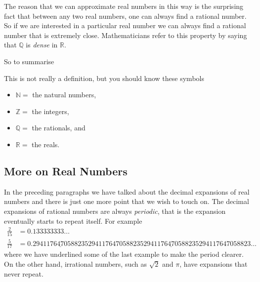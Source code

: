 \begin{itemize}
The reason that we can approximate real numbers in this way is the
surprising fact that between any two real numbers, one can always find a
rational number. So if we are interested in a particular real number we can
always find a rational number that is extremely close. Mathematicians refer
to this property by saying that $\mathbb{Q}$ is \emph{dense} in $\mathbb{R}$.
\end{itemize}
So to summarise
\begin{defn}\label{def_0_1_1}
  This is not really a definition, but you should know these symbols
 \begin{itemize}
  \item $\mathbb{N} = $ the natural numbers,
  \item $\mathbb{Z} = $ the integers,
  \item $\mathbb{Q} = $ the rationals, and
  \item $\mathbb{R} = $ the reals.
 \end{itemize}

\end{defn}



\subsection*{More on Real Numbers}
In the preceding paragraphs we have talked about the decimal expansions of real
numbers and there is just one more point that we wish to touch on. The decimal
expansions of rational numbers are always \emph{periodic}, that is the expansion
eventually starts to repeat itself. For example
\begin{align*}
  \frac{2}{15} &= 0.133333333\dots \\
  \frac{5}{17} &=
0.\underline{
2941176470588235}2941176470588235\underline{2941176470588235}
294117647058823\dots
\end{align*}
where we have underlined some of the last example to make the period clearer.
On the other hand, irrational numbers, such as $\sqrt{2}$ and $\pi$, have
expansions that never repeat.

